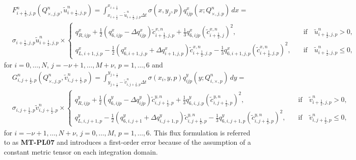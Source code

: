 \begin{align}
	\label{chp5-flux-xdir--pl07}
	&F_{i+\frac{1}{2},j,p}^n ({Q^n_{\times,j,p},\tilde{u}^n_{i+\frac{1}{2},j,p}}) = 
	\int_{x_{i+\frac{1}{2}}-\tilde{u}_{i+\frac{1}{2},j,p}^n\Delta t}^{x_{i+\frac{1}{2}}}
	{\sigma(x,y_j,p) q_{ijp}^x(x;Q_{\times, j,p}^n) \,dx} = \\
	&{\sigma}_{i+\frac{1}{2},j,p}\tilde{u}^{n}_{i+\frac{1}{2},j,p} \times
	\begin{cases}
		q_{R,ijp}^x +\frac{1}{2}(q_{6,ijp}^x - \Delta q_{ijp}^x){\tilde{c}_{i+\frac{1}{2},j,p}^{x,n}}
		+\frac{1}{3}{q_{6,ijp}^x}(\tilde{c}_{i+\frac{1}{2},j}^{x,n})^2,
		\quad &\text{if} \quad \tilde{u}_{i+\frac{1}{2},j,p}^n>0,\\ \nonumber
		q_{L,i+1,j,p}^x - \frac{1}{2}(q_{6,i+1,j,p}^x + \Delta q_{i+1,j,p}^x){\tilde{c}_{i+\frac{1}{2},j,p}^{x,n}}
		-\frac{1}{3}{q_{6,i+1,j,p}^x}(\tilde{c}_{i+\frac{1}{2},j,p}^{x,n})^2,
		\quad &\text{if} \quad \tilde{u}_{i+\frac{1}{2},j,p}^n\leq0,\nonumber
	\end{cases}
\end{align}
for $i=0, \ldots, N$, $j=-\nu+1, \ldots, M+\nu$, $p=1,\ldots,6$ and 
\begin{align}
	\label{chp5-flux-ydir-pl07}
	&G_{i,j+\frac{1}{2},p}^n ({Q^n_{\times,j,p},\tilde{v}^n_{i,j+\frac{1}{2},p}}) =
	\int_{y_{j+\frac{1}{2}}-\tilde{v}_{i,j+\frac{1}{2},p}^n\Delta t}^{y_{j+\frac{1}{2}}}
	{\sigma(x_i,y,p)q_{ijp}^y(y;Q_{i,\times, p}^n) \,dy} = \\
	&{\sigma}_{i,j+\frac{1}{2},p} \tilde{v}^n_{i,j+\frac{1}{2},p}\times
	\begin{cases}
		q_{R,ijp}^y +\frac{1}{2}(q_{6,ijp}^y - \Delta q_{ijp}^y){\tilde{c}_{i,j+\frac{1}{2},p}^{y,n}}
		+\frac{1}{3}{q_{6,i,j,p}^y}(\tilde{c}_{i,j+\frac{1}{2},p}^{y,n})^2,
		\quad &\text{if} \quad \tilde{v}_{i+\frac{1}{2},j,p}^n>0,\\ \nonumber
		q_{L,i,j+1,p}^y - \frac{1}{2}(q_{6,i,j+1}^y + \Delta q_{i,j+1,p}^y){\tilde{c}_{i,j+\frac{1}{2},p}^{y,n}}
		-\frac{1}{3}{q_{6,i,j+1,p}^y}(\tilde{c}_{i,j+\frac{1}{2},p}^{y,n})^2,
		\quad &\text{if} \quad \tilde{v}_{i,j+\frac{1}{2},p}^n\leq0,\nonumber
	\end{cases}
\end{align}
for $i=-\nu+1, \ldots, N+\nu$, $j=0, \ldots, M$, $p=1,\ldots,6$.
This flux formulation is referred to as \textbf{MT-PL07} and introduces a first-order
error because of the assumption of a constant metric tensor on each integration domain.

